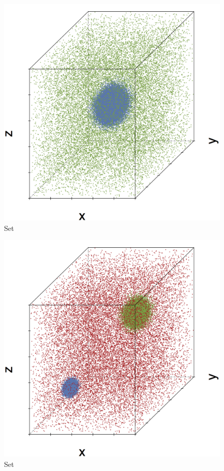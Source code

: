 \begin{subfigure}{0.18\textwidth}
	\centering
	\includegraphics[width=\textwidth]{3/img/datasetplot_ferdosi_1_60000.png}
	\caption{Set \ferdosiOne}
	\label{fig:3:simulated:datasets:ferdosi1}
\end{subfigure}
\begin{subfigure}{0.18\textwidth}
	\centering
	\includegraphics[width=\textwidth]{3/img/datasetplot_ferdosi_2_60000.png}
	\caption{Set \ferdosiTwo}
	\label{fig:3:simulated:datasets:ferdosi2}
\end{subfigure}	
